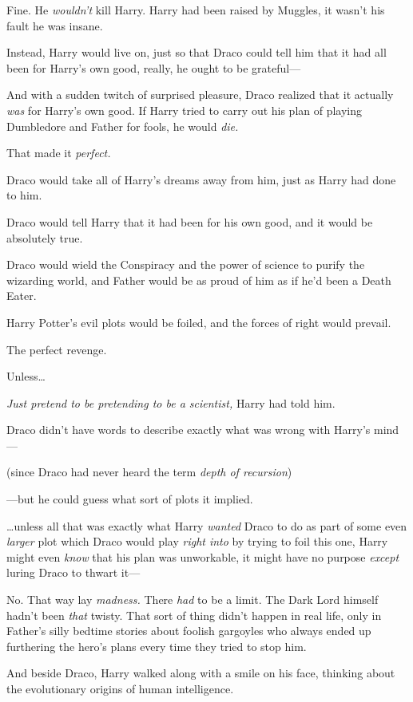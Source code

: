 Fine. He \emph{wouldn’t} kill Harry. Harry had been raised by Muggles, it wasn’t his fault he was insane.

Instead, Harry would live on, just so that Draco could tell him that it had all been for Harry’s own good, really, he ought to be grateful—

And with a sudden twitch of surprised pleasure, Draco realized that it actually \emph{was} for Harry’s own good. If Harry tried to carry out his plan of playing Dumbledore and Father for fools, he would \emph{die.}

That made it \emph{perfect.}

Draco would take all of Harry’s dreams away from him, just as Harry had done to him.

Draco would tell Harry that it had been for his own good, and it would be absolutely true.

Draco would wield the Conspiracy and the power of science to purify the wizarding world, and Father would be as proud of him as if he’d been a Death Eater.

Harry Potter’s evil plots would be foiled, and the forces of right would prevail.

The perfect revenge.

Unless…

\emph{Just pretend to be pretending to be a scientist,} Harry had told him.

Draco didn’t have words to describe exactly what was wrong with Harry’s mind—

(since Draco had never heard the term \emph{depth of recursion})

—but he could guess what sort of plots it implied.

…unless all that was exactly what Harry \emph{wanted} Draco to do as part of some even \emph{larger} plot which Draco would play \emph{right into} by trying to foil this one, Harry might even \emph{know} that his plan was unworkable, it might have no purpose \emph{except} luring Draco to thwart it—

No. That way lay \emph{madness.} There \emph{had} to be a limit. The Dark Lord himself hadn’t been \emph{that} twisty. That sort of thing didn’t happen in real life, only in Father’s silly bedtime stories about foolish gargoyles who always ended up furthering the hero’s plans every time they tried to stop him.

\later

And beside Draco, Harry walked along with a smile on his face, thinking about the evolutionary origins of human intelligence.

